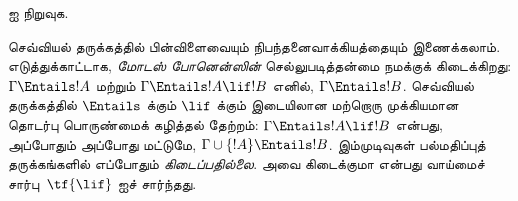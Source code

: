 \documentclass[../../../include/open-logic-section]{subfiles}
\begin{document}
\begin{prob}
 ஐ நிறுவுக.
\end{prob}

செவ்வியல் தருக்கத்தில் பின்விளைவையும் நிபந்தனைவாக்கியத்தையும் இணைக்கலாம்.
எடுத்துக்காட்டாக, \emph{மோடஸ் போனென்ஸின்} செல்லுபடித்தன்மை நமக்குக்
கிடைக்கிறது: $\Gamma \Entails !A$ மற்றும் $\Gamma \Entails !A \lif !B$
எனில், $\Gamma \Entails !B$. செவ்வியல் தருக்கத்தில் $\Entails$ க்கும்
$\lif$ க்கும் இடையிலான மற்றொரு முக்கியமான தொடர்பு பொருண்மைக் கழித்தல்
தேற்றம்: $\Gamma \Entails !A \lif !B$ என்பது, அப்போதும் அப்போது மட்டுமே,
$\Gamma \cup \{!A\} \Entails !B$. இம்முடிவுகள் பல்மதிப்புத்
தருக்கங்களில் எப்போதும் \emph{கிடைப்பதில்லை}. அவை கிடைக்குமா என்பது
வாய்மைச் சார்பு~$\tf{\lif}$ ஐச் சார்ந்தது.
\end{document}
